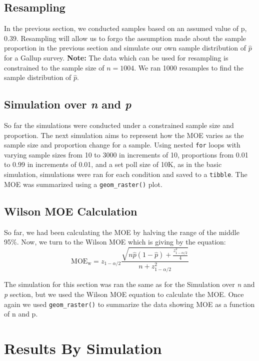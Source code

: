 \documentclass{article}\usepackage[]{graphicx}\usepackage[]{xcolor}
\begin{document}
\begin{multicols}{2}
\subsection{Resampling}
In the previous section, we conducted samples based on an assumed value of p, 0.39. Resampling will allow us to forgo the assumption made about the sample proportion in the previous section and simulate our own sample distribution of $\hat{p}$ for a Gallup survey. \textbf{Note:} The data which can be used for resampling is constrained to the sample size of $n = 1004$. We ran 1000 resamples to find the sample distribution of $\hat{p}$.

\subsection{Simulation over \textit{n} and \textit{p}}
So far the simulations were conducted under a constrained sample size and proportion. The next simulation aims to represent how the MOE varies as the sample size and proportion change for a sample. Using nested \texttt{for} loops with varying sample sizes from 10 to 3000 in increments of 10, proportions from 0.01 to 0.99 in increments of 0.01, and a set poll size of 10K, as in the basic simulation, simulations were ran for each condition and saved to a \texttt{tibble}. The MOE was summarized using a \verb|geom_raster()| plot. 

\subsection{Wilson MOE Calculation}
So far, we had been calculating the MOE by halving the range of the middle 95\%. Now, we turn to the Wilson MOE which is giving by the equation: \[\text{MOE}_{\text{w}} = z_{1-\alpha/2}\frac{ \sqrt{n\hat{p}(1-\hat{p}) + \frac{{z^2_{1-\alpha/2}}}{4}}}{n + {z^2_{1-\alpha/2}}}\]

The simulation for this section was ran the same as for the Simulation over \textit{n} and \textit{p} section, but we used the Wilson MOE equation to calculate the MOE. Once again we used \verb|geom_raster()| to summarize the data showing MOE as a function of n and p. 


\section{Results By Simulation}

\end{multicols}
\end{document}
